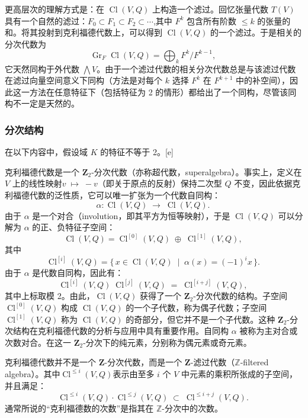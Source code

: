 更高层次的理解方式是：在 $\operatorname{Cl}(V, Q)$ 上构造一个滤过。回忆张量代数 $T(V)$ 具有一个自然的滤过：$F_0 \subset F_1 \subset F_2 \subset \cdots$,其中 $F^k$ 包含所有阶数 $\leq k$ 的张量的和。将其投射到克利福德代数上，可以得到 $\operatorname{Cl}(V, Q)$ 的一个滤过。于是相关的分次代数为
$$
\operatorname{Gr}_F \operatorname{Cl}(V, Q) = \bigoplus_k F^k / F^{k-1},~
$$
它天然同构于外代数 $\bigwedge V$。由于一个滤过代数的相关分次代数总是与该滤过代数在滤过向量空间意义下同构（方法是对每个 $k$ 选择 $F^k$ 在 $F^{k+1}$ 中的补空间），因此这一方法在任意特征下（包括特征为 2 的情形）都给出了一个同构，尽管该同构不一定是天然的。
\subsubsection{分次结构}
在以下内容中，假设域 $K$ 的特征不等于 2。[e]

克利福德代数是一个 $\mathbf{Z}_2$-分次代数（亦称超代数，superalgebra）。事实上，定义在 $V$ 上的线性映射$v \;\mapsto\; -v$（即关于原点的反射）保持二次型 $Q$ 不变，因此依据克利福德代数的泛性质，它可以唯一扩张为一个代数自同构：
$$
\alpha : \operatorname{Cl}(V, Q) \;\longrightarrow\; \operatorname{Cl}(V, Q).~
$$
由于 $\alpha$ 是一个对合（involution，即其平方为恒等映射），于是 $\operatorname{Cl}(V, Q)$ 可以分解为 $\alpha$ 的正、负特征子空间：
$$
\operatorname{Cl}(V, Q) = \operatorname{Cl}^{[0]}(V, Q) \;\oplus\; \operatorname{Cl}^{[1]}(V, Q),~
$$
其中
$$
\operatorname{Cl}^{[i]}(V, Q) = \{\, x \in \operatorname{Cl}(V, Q) \;\mid\; \alpha(x) = (-1)^i x \,\}.~
$$
由于 $\alpha$ 是代数自同构，因此有：
$$
\operatorname{Cl}^{[i]}(V, Q)\; \operatorname{Cl}^{[j]}(V, Q) \;=\; \operatorname{Cl}^{[i+j]}(V, Q),~
$$
其中上标取模 2。由此，$\operatorname{Cl}(V, Q)$ 获得了一个 $\mathbf{Z}_2$-分次代数的结构。子空间 $\operatorname{Cl}^{[0]}(V, Q)$ 构成 $\operatorname{Cl}(V, Q)$ 的一个子代数，称为偶子代数；子空间 $\operatorname{Cl}^{[1]}(V, Q)$ 称为 $\operatorname{Cl}(V, Q)$ 的奇部分，但它并不是一个子代数。这种 $\mathbf{Z}_2$-分次结构在克利福德代数的分析与应用中具有重要作用。自同构 $\alpha$ 被称为主对合或次数对合。在这一 $\mathbf{Z}_2$-分次下的纯元素，分别称为偶元素或奇元素。

克利福德代数并不是一个 $\mathbf{Z}$-分次代数，而是一个 $\mathbf{Z}$-滤过代数（$\mathbb{Z}$-filtered algebra）。其中$\operatorname{Cl}^{\leqslant i}(V, Q)$表示由至多 $i$ 个 $V$ 中元素的乘积所张成的子空间，并且满足：
$$
\operatorname{Cl}^{\leqslant i}(V, Q) \cdot \operatorname{Cl}^{\leqslant j}(V, Q) \;\subset\; \operatorname{Cl}^{\leqslant i+j}(V, Q).~
$$
通常所说的“克利福德数的次数”是指其在 $\mathbb{Z}$-分次中的次数。

